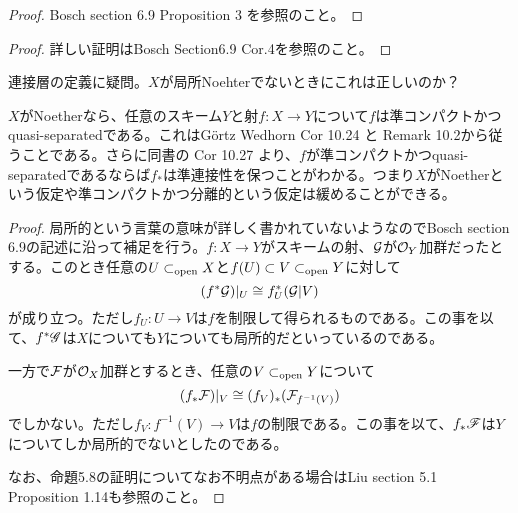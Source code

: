 
\begin{proof}
  Bosch\cite{Bosch} section 6.9 Proposition 3 を参照のこと。
\end{proof}


\begin{proof}
  詳しい証明はBosch\cite{Bosch} Section6.9 Cor.4を参照のこと。
\end{proof}


\begin{rem}
  連接層の定義に疑問。$X$が局所Noehterでないときにこれは正しいのか？
\end{rem}


\begin{rem}
  $X$がNoetherなら、任意のスキーム$Y$と射$f \colon X \to Y$について$f$は準コンパクトかつquasi-separatedである。これはG\"ortz Wedhorn\cite{GW} Cor 10.24 と Remark 10.2から従うことである。さらに同書の Cor 10.27 より、$f$が準コンパクトかつquasi-separatedであるならば$f_*$は準連接性を保つことがわかる。つまり$X$がNoetherという仮定や準コンパクトかつ分離的という仮定は緩めることができる。
\end{rem}


\begin{proof}
局所的という言葉の意味が詳しく書かれていないようなのでBosch\cite{Bosch} section 6.9の記述に沿って補足を行う。$f \colon X \to Y$がスキームの射、$\mathcal{G}$が$\mathcal{O}_Y$加群だったとする。このとき任意の$U \subset_{\text{open}} X$と$f(U) \subset V \subset_{\text{open}} Y$に対して
\[
(f^* \mathcal{G})|_U \cong f^*_U(\mathcal{G}|V)
\]
が成り立つ。ただし$f_U \colon U \to V$は$f$を制限して得られるものである。この事を以て、$f^*\mathscr{G}$は$X$についても$Y$についても局所的だといっているのである。

一方で$\mathcal{F}$が$\mathcal{O}_X$加群とするとき、任意の$V \subset_{\text{open}} Y$について
\[
(f_* \mathcal{F})|_V \cong (f_V)_* (\mathcal{F}_{f^{-1}(V)})
\]
でしかない。ただし$f_V \colon f^{-1}(V) \to V$は$f$の制限である。この事を以て、$f_*  \mathscr{F}$は$Y$についてしか局所的でないとしたのである。

なお、命題5.8の証明についてなお不明点がある場合はLiu\cite{Liu} section 5.1 Proposition 1.14も参照のこと。
\end{proof}
